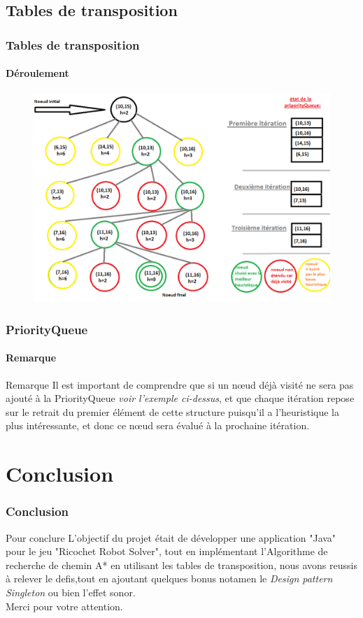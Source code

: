 \documentclass[t]{beamer}
\begin{document}
\subsection{Tables de transposition}
\begin{frame}
\frametitle{Tables de transposition}
\framesubtitle{Déroulement}
\begin{center}
\begin{figure}[h!]
\centerline{\includegraphics[scale=0.5]{tableDeTransposition.png}}
\end{figure}
\end{center}
\end{frame}

\begin{frame}
\frametitle{PriorityQueue}
\framesubtitle{Remarque}
\begin{center}
\begin{alertblock}{Remarque } 
Il est important de comprendre que si un nœud déjà visité ne sera pas ajouté à la PriorityQueue \textit{voir l'exemple ci-dessus}, et que chaque itération repose sur le retrait du premier élément de cette structure puisqu'il a l'heuristique la plus intéressante, et donc ce nœud sera évalué à la prochaine itération.
\end{alertblock}
\end{center}
\end{frame}

\section{Conclusion}
\begin{frame}
\frametitle{Conclusion}
\begin{center}
\begin{block}{Pour conclure } 
L’objectif du projet était de développer une application "Java" pour le jeu "Ricochet Robot Solver", tout en implémentant l'Algorithme de recherche de chemin A* en utilisant les tables de transposition, nous avons reussis à relever le defis,tout en ajoutant quelques bonus notamen le \textit{Design pattern Singleton} ou bien l'effet sonor.
\\Merci pour votre attention.
\end{block}
\end{center}
\end{frame}
\end{document}
